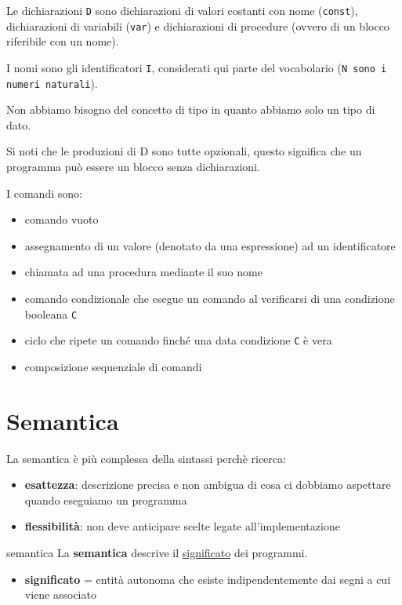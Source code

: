 \smallskip
Le dichiarazioni \texttt{D} sono dichiarazioni di valori costanti con nome (\texttt{const}), dichiarazioni di variabili (\texttt{var}) e dichiarazioni di procedure (ovvero di un blocco riferibile con un nome).

\smallskip
I nomi sono gli identificatori \texttt{I}, considerati qui parte del vocabolario (\texttt{N sono i numeri naturali}).

\smallskip
Non abbiamo bisogno del concetto di tipo in quanto abbiamo solo un tipo di dato. 

\smallskip
Si noti che le produzioni di D sono tutte opzionali, questo significa che un programma può essere un blocco senza dichiarazioni. 

\smallskip
I comandi sono: 
\begin{itemize}[label=$\diamond$, itemsep=\smallskipamount]
    \item comando vuoto
    \item assegnamento di un valore (denotato da una espressione) ad un identificatore
    \item chiamata ad una procedura mediante il suo nome
    \item comando condizionale che esegue un comando al verificarsi di una condizione booleana \texttt{C}
    \item ciclo che ripete un comando finché una data condizione \texttt{C} è vera
    \item composizione sequenziale di comandi
\end{itemize}


\section{Semantica}
La semantica è più complessa della sintassi perchè ricerca:
\begin{itemize}[label=$\triangleright$, itemsep=\smallskipamount]
    \item \textbf{esattezza}: descrizione precisa e non ambigua di cosa ci dobbiamo aspettare quando eseguiamo un programma
    \item \textbf{flessibilità}: non deve anticipare scelte legate all'implementazione
\end{itemize}

\begin{mydef}{semantica}
    La \textbf{semantica} descrive il \underline{significato} dei programmi.

    \smallskip
    \begin{itemize}[label=$\Rightarrow$]
        \item \textbf{significato} = entità autonoma che esiste indipendentemente dai segni a cui viene associato
    \end{itemize}
\end{mydef}

